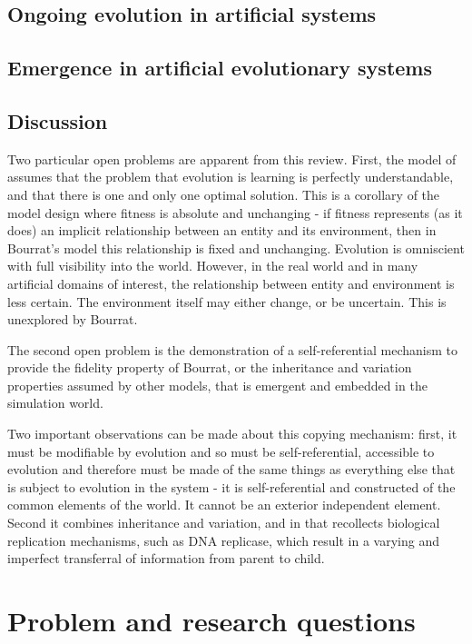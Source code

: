 \documentclass[]{report}
\begin{document}
\subsection{Ongoing evolution in artificial systems}
\subsection{Emergence in artificial evolutionary systems}

\subsection{Discussion}

Two particular open problems are apparent from this review. First, the model of \cite{Bourrat2015} assumes that the problem that evolution is learning is perfectly understandable, and that there is one and only one optimal solution. This is a corollary of the model design where fitness is absolute and unchanging - if fitness represents (as it does) an implicit relationship between an entity and its environment, then in Bourrat's model this relationship is fixed and unchanging. Evolution is omniscient with full visibility into the world. However, in the real world and in many artificial domains of interest, the relationship between entity and environment is less certain. The environment itself may either change, or be uncertain. This is unexplored by Bourrat.

The second open problem is the demonstration of a self-referential mechanism to provide the fidelity property of Bourrat, or the inheritance and variation properties assumed by other models, that is emergent and embedded in the simulation world. 

Two important observations can be made about this copying mechanism: first, it must be modifiable by evolution and so must be self-referential, accessible to evolution and therefore must be made of the same things as everything else that is subject to evolution in the system - it is self-referential and constructed of the common elements of the world. It cannot be an exterior independent element. Second it combines inheritance and variation, and in that recollects biological replication mechanisms, such as DNA replicase, which result in a varying and imperfect transferral of information from parent to child. 

\section{Problem and research questions}\label{research-questions}
\end{document}
